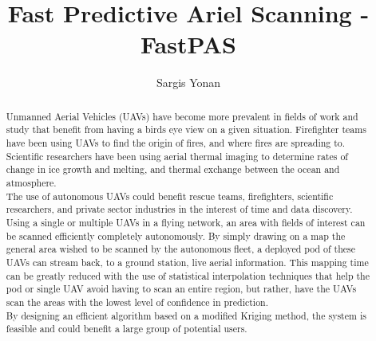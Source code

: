 \documentclass[preprint,12pt]{elsarticle}
\begin{document}
\begin{frontmatter}


\title{Fast Predictive Ariel Scanning - FastPAS}




\author{Sargis Yonan}
\begin{abstract}
Unmanned Aerial Vehicles (UAVs) have become more prevalent in fields of work and study that benefit from having a birds eye view on a given situation. Firefighter teams have been using UAVs to find the origin of fires, and where fires are spreading to. Scientific researchers have been using aerial thermal imaging to determine rates of change in ice growth and melting, and thermal exchange between the ocean and atmosphere.\\
The use of autonomous UAVs could benefit rescue teams, firefighters, scientific researchers, and private sector industries in the interest of time and data discovery. Using a single or multiple UAVs in a flying network, an area with fields of interest can be scanned efficiently completely autonomously. By simply drawing on a map the general area wished to be scanned by the autonomous fleet, a deployed pod of these UAVs can stream back, to a ground station, live aerial information. This mapping time can be greatly reduced with the use of statistical interpolation techniques that help the pod or single UAV avoid having to scan an entire region, but rather, have the UAVs scan the areas with the lowest level of confidence in prediction.\\
By designing an efficient algorithm based on a modified Kriging method, the system is feasible and could benefit a large group of potential users.
\end{abstract}




\end{frontmatter}
\end{document}
